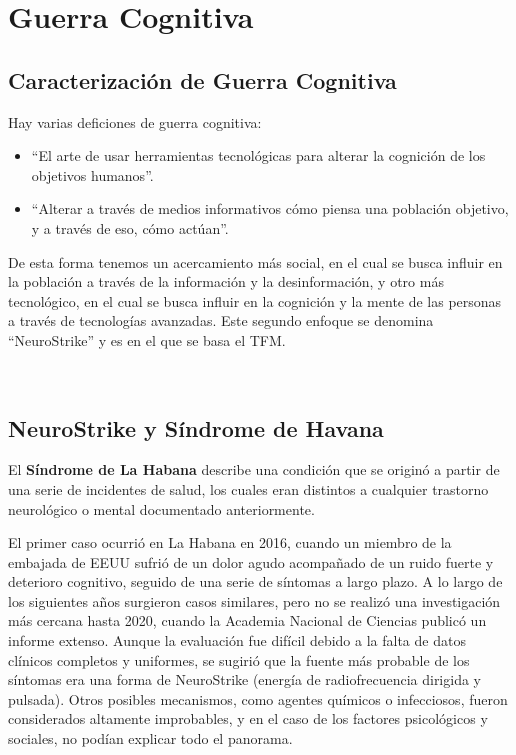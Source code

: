 \documentclass[12pt, letterpaper]{article}
\title{\doctitle}
\author{Juan Luis Serradilla Tormos}
\date{\monthname[\month] de \the\year}
\begin{document}
\pagestyle{fancy}

\maketitle

\newpage
\tableofcontents

\newpage
\section{Guerra Cognitiva}

\subsection{Caracterización de Guerra Cognitiva}

Hay varias deficiones de guerra cognitiva:
\begin{itemize}
    \item ``El arte de usar herramientas tecnológicas para alterar la cognición de los objetivos humanos''.
    \item ``Alterar a través de medios informativos cómo piensa una población objetivo, y a través de eso, cómo actúan''.
\end{itemize}

De esta forma tenemos un acercamiento más social, en el cual se busca influir en la población a través de la información y la desinformación, y otro más tecnológico, en el cual se busca influir en la cognición y la mente de las personas a través de tecnologías avanzadas. Este segundo enfoque se denomina ``NeuroStrike'' y es en el que se basa el TFM.\@

\
\subsection{NeuroStrike y Síndrome de Havana}

El \textbf{Síndrome de La Habana} describe una condición que se originó a partir de una serie de incidentes de salud, los cuales eran distintos a cualquier trastorno neurológico o mental documentado anteriormente. 

El primer caso ocurrió en La Habana en 2016, cuando un miembro de la embajada de EEUU sufrió de un dolor agudo acompañado de un ruido fuerte y deterioro cognitivo, seguido de una serie de síntomas a largo plazo. A lo largo de los siguientes años surgieron casos similares, pero no se realizó una investigación más cercana hasta 2020, cuando la Academia Nacional de Ciencias publicó un informe extenso. Aunque la evaluación fue difícil debido a la falta de datos clínicos completos y uniformes, se sugirió que la fuente más probable de los síntomas era una forma de NeuroStrike (energía de radiofrecuencia dirigida y pulsada). Otros posibles mecanismos, como agentes químicos o infecciosos, fueron considerados altamente improbables, y en el caso de los factores psicológicos y sociales, no podían explicar todo el panorama.\@
\end{document}
